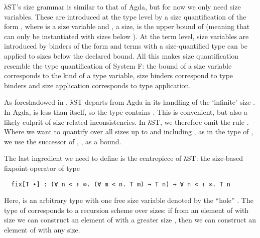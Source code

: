 λST's size grammar is similar to that of Agda, but for now we only need size
variables. These are introduced at the type level by a size quantification of
the form , where  is a size variable and , a
size, is the upper bound of  (meaning that  can only be
instantiated with sizes below ). At the term level, size variables are
introduced by binders of the form  and terms with a
size-quantified type can be applied to sizes below the declared bound. All this
makes size quantification resemble the type quantification of System F: the
bound of a size variable corresponds to the kind of a type variable, size
binders correspond to type binders and size application corresponds to type
application.

As foreshadowed in , λST departs from Agda in its
handling of the \enquote*{infinite} size . In Agda,  is less
than itself, so the type  contains . This is convenient,
but also a likely culprit of size-related inconsistencies. In λST, we therefore
omit the rule . Where we want to quantify over all sizes up to and
including , as in the type of , we use the successor of
, , as a bound.

The last ingredient we need to define  is the centrepiece of λST:
the size-based fixpoint operator  of type
\begin{verbatim}
  fix[T ∙] : (∀ n < ↑ ∞. (∀ m < n. T m) → T n) → ∀ n < ↑ ∞. T n
\end{verbatim}
Here,  is an arbitrary type with one free size variable denoted by the
\enquote{hole} . The type of  corresponds to a recursion
scheme over sizes: if from an element of  with size  we can
construct an element of  with a greater size , then we can
construct an element of  with any size.


